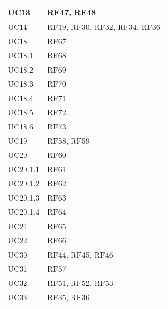 \begin{center}
\begin{longtable}{|C{5cm}|C{5cm}|}
        \hline
        UC13 & RF47, RF48 \\
        \hline
        UC14 & RF19, RF30, RF32, RF34, RF36 \\
        \hline
        UC18 & RF67 \\
        \hline
        UC18.1 & RF68 \\
        \hline
        UC18.2 & RF69 \\
        \hline
        UC18.3 & RF70 \\
        \hline
        UC18.4 & RF71 \\
        \hline
        UC18.5 & RF72 \\
        \hline
        UC18.6 & RF73 \\
        \hline
        UC19 & RF58, RF59 \\
        \hline
        UC20 & RF60 \\
        \hline
        UC20.1.1 & RF61 \\
        \hline
        UC20.1.2 & RF62 \\
        \hline
        UC20.1.3 & RF63 \\
        \hline
        UC20.1.4 & RF64 \\
        \hline
        UC21 & RF65 \\
        \hline
        UC22 & RF66 \\
        \hline
        UC30 & RF44, RF45, RF46 \\
        \hline
        UC31 & RF57 \\
        \hline
        UC32 & RF51, RF52, RF53 \\
        \hline
        UC33 & RF35, RF36 \\
        \hline
    \end{longtable}
\end{center}

